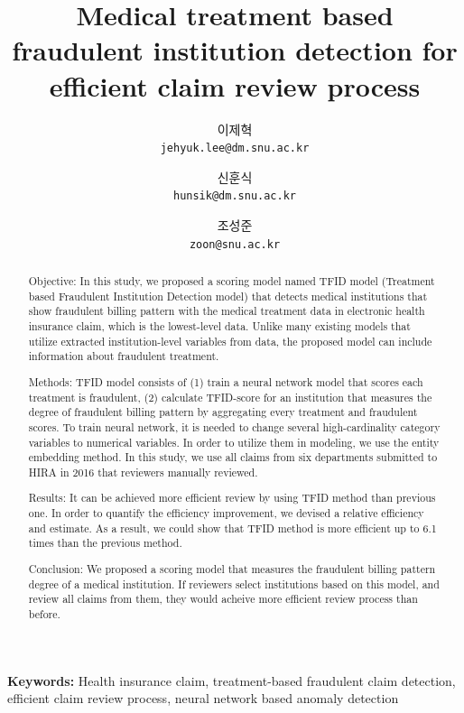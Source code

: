 \documentclass[11pt]{article}           %
\begin{document}
\title{Medical treatment based fraudulent institution detection for efficient claim review process}
\author{
  이제혁\\
  \texttt{jehyuk.lee@dm.snu.ac.kr}
  \and
  신훈식\\
  \texttt{hunsik@dm.snu.ac.kr}
  \and
  조성준\\
  \texttt{zoon@snu.ac.kr}
}

\maketitle

\begin{abstract}
Objective: In this study, we proposed a scoring model named TFID model (Treatment based Fraudulent Institution Detection model) that detects medical institutions that show fraudulent billing pattern with the medical treatment data in electronic health insurance claim, which is the lowest-level data.
Unlike many existing models that utilize extracted institution-level variables from data, the proposed model can include information about fraudulent treatment.

Methods: TFID model consists of (1) train a neural network model that scores each treatment is fraudulent, (2) calculate TFID-score for an institution that measures the degree of fraudulent billing pattern by aggregating every treatment and fraudulent scores.
To train neural network, it is needed to change several high-cardinality category variables to numerical variables.
In order to utilize them in modeling, we use the entity embedding method.
In this study, we use all claims from six departments submitted to HIRA in 2016 that reviewers manually reviewed.

Results: It can be achieved more efficient review by using TFID method than previous one.
In order to quantify the efficiency improvement, we devised a relative efficiency and estimate.
As a result, we could show that TFID method is more efficient up to 6.1 times than the previous method.

Conclusion: We proposed a scoring model that measures the fraudulent billing pattern degree of a medical institution.
If reviewers select institutions based on this model, and review all claims from them, they would acheive more efficient review process than before.

\end{abstract}
\smallskip

\begin{center}
\textbf{Keywords:} Health insurance claim, treatment-based fraudulent claim detection, efficient claim review process, neural network based anomaly detection
\end{center}
\end{document}
